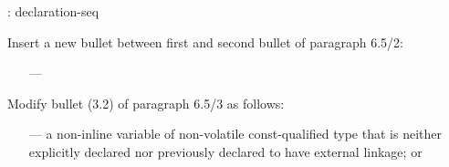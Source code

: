 \begin{extract}
\begin{bnf}
:\br
     declaration-seq\opt
\end{bnf}

\begin{bnf}
\end{bnf}
\end{extract}

\noindent
Insert a new bullet between first and second bullet of paragraph 6.5/2:

\begin{std.txt}\color{addclr}
  \begin{itemize}
    \item[---] 
  \end{itemize}
\end{std.txt}

\noindent
Modify bullet (3.2) of paragraph 6.5/3 as follows:
\begin{std.txt}
  \begin{itemize}
    \item[---] a non-inline  variable of non-volatile const-qualified type 
    that is neither explicitly declared  nor
    previously declared to have external  linkage; or
  \end{itemize}
\end{std.txt}

